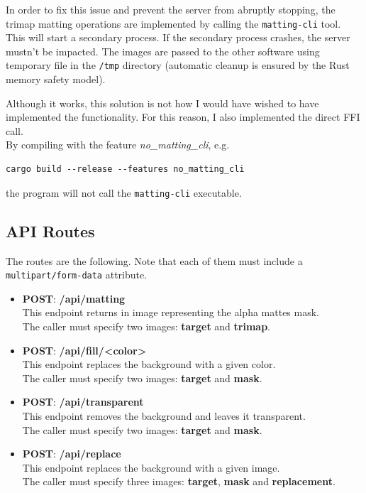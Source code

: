 \documentclass[a4paper]{article}
\begin{document}
In order to fix this issue and prevent the server from abruptly stopping,
the \gls{trimap} \gls{matting} operations are implemented by calling the \texttt{matting-cli}
tool. This will start a secondary process. If the secondary process crashes,
the server mustn't be impacted. The images are passed to the other software using
temporary file in the \texttt{/tmp} directory (automatic cleanup
is ensured by the \gls{Rust} memory safety model).

Although it works, this solution is not how I would have wished to have implemented
the functionality. For this reason, I also implemented the direct \gls{FFI} call. \\
By compiling with the feature \textit{no\_matting\_cli}, e.g.
\begin{lstlisting}[style=Rust, style=boxed]
    cargo build --release --features no_matting_cli
\end{lstlisting}
the program will not call the \texttt{matting-cli} executable.

\pagebreak

\subsection{API Routes}

The routes are the following.
Note that each of them must include
a \texttt{multipart/form-data} attribute.

\begin{itemize}
    \item \textbf{POST}: \textbf{/api/matting} \\
        This endpoint returns in image representing the alpha mattes mask. \\
        The caller must specify two images: \textbf{target} and \textbf{trimap}.
    \item \textbf{POST}: \textbf{/api/fill/<color>} \\
        This endpoint replaces the background with a given color. \\
        The caller must specify two images: \textbf{target} and \textbf{mask}.
    \item \textbf{POST}: \textbf{/api/transparent} \\
        This endpoint removes the background and leaves it transparent. \\
        The caller must specify two images: \textbf{target} and \textbf{mask}.
    \item \textbf{POST}: \textbf{/api/replace} \\
        This endpoint replaces the background with a given image. \\
        The caller must specify three images: \textbf{target}, \textbf{mask} and \textbf{replacement}.
\end{itemize}
\end{document}
